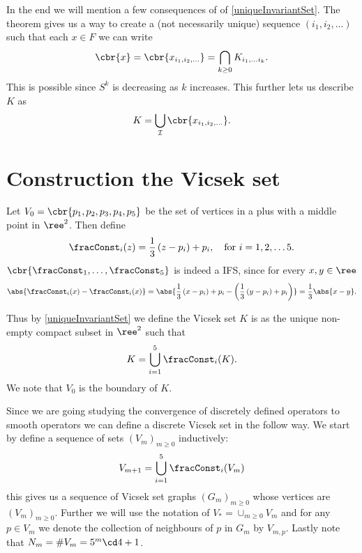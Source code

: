 In the end we will mention a few consequences of of \cref{uniqueInvariantSet}. The theorem gives us a way to create a (not necessarily unique) sequence $(i_1, i_2, \ldots)$ such that each $x \in F$ we can write
\begin{equation}\label{pointAsIntersectSet}
	\cbr{x} = \cbr{x_{i_1, i_2, \ldots}} = \bigcap_{k \geq 0} K_{i_1, \ldots i_k}.
\end{equation}
This is possible since $S^{k}$ is decreasing as $k$ increases. This further lets us describe $K$ as
\begin{equation}\label{InvSetAsPoint}
	K = \bigcup_{\mathcal{I}} \cbr{x_{i_1, i_2, \ldots}}.
\end{equation}


\section{Construction the Vicsek set}

Let $V_0 = \cbr{p_1, p_2, p_3, p_4, p_5}$ be the set of vertices in a plus with a middle point in $\ree^{2}$. Then define
\begin{equation}
	\fracConst_i(z) = \frac{1}{3} \left(z - p_i\right) +p_i, \quad \text{for } i = 1,2,\ldots 5.
\end{equation}
$\cbr{\fracConst_{1}, \ldots, \fracConst_{5}}$ is indeed a IFS, since for every $x, y \in \ree$
\begin{equation}
	\abs{\fracConst_{i}(x)-\fracConst_{i}(x)} = \abs{\frac{1}{3} \left(x - p_i\right) +p_i - \left(\frac{1}{3} \left(y - p_i\right) +p_i\right)} =\frac{1}{3}\abs{x-y}.
\end{equation}

Thus by \cref{uniqueInvariantSet} we define the Vicsek set $K$ is as the unique non-empty compact subset in $\ree^{2}$ such that
\begin{equation}
	K = \bigcup_{i = 1}^{5} \fracConst_i(K).
\end{equation}
We note that $V_0$ is the boundary of $K$.

Since we are going studying the convergence of discretely defined operators to smooth operators we can define a discrete Vicsek set in the follow way. We start by define a sequence of sets $(V_m)_{m \geq 0}$ inductively:
\begin{equation}
	V_{m+1} = \bigcup_{i = 1}^{5} \fracConst_i(V_m)
\end{equation}
this gives us a sequence of Vicsek set graphs $(G_m)_{m\geq 0}$ whose vertices are $(V_m)_{m \geq 0}$. Further we will use the notation of $V_{\ast} = \cup_{m \geq 0} V_m$ and for any $p \in V_m$ we denote the collection of neighbours of $p$ in $G_m$ by $V_{m,p}$. Lastly note that $N_m = \# V_m = 5^{m}\cd 4 + 1$.



